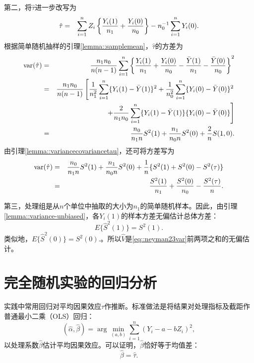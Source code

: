 第二，将$\hat{\tau}$进一步改写为
\begin{eqnarray*}
\hat{\tau} &=&  \sum_{i=1}^n Z_i  \left\{    \frac{  Y_i(1) }{ n_1 } + \frac{  Y_i(0) }{ n_0 }   \right\}
- n_0^{-1} \sum_{i=1}^n Y_i(0).
\end{eqnarray*}
根据简单随机抽样的引理\ref{lemma::samplemean}，$\hat{\tau}$的方差为
\begin{eqnarray*}
\textup{var}(\hat{\tau}) &=&  \frac{  n_1 n_0  }{  n(n-1)  }  \sum_{i=1}^n  
\left\{    \frac{  Y_i(1) }{ n_1 } + \frac{  Y_i(0) }{ n_0 }  -  \frac{  \bar{Y}(1) }{ n_1 } - \frac{  \bar{Y}(0) }{ n_0 }    \right\}^2 \\
&=&  \frac{  n_1 n_0  }{  n(n-1)  }  \left[
\frac{1}{n_1^{2}}   \sum_{i=1}^n  \{  Y_i(1) -  \bar{Y}(1)\}^2 + \frac{1}{n_0^{2}}  \sum_{i=1}^n  \{  Y_i(0) -  \bar{Y}(0)\}^2 \right. \\
&& \left. \qquad \qquad 
+ \frac{2}{n_1 n_0}  \sum_{i=1}^n  \{  Y_i(1) -  \bar{Y}(1)\}  \{  Y_i(0) -  \bar{Y}(0)\} 
\right]\\
&=& \frac{n_0}{n_1n} S^2(1) + \frac{n_1}{n_0n}S^2(0) + \frac{2}{n} S(1,0). 
\end{eqnarray*}
由引理\ref{lemma::variancecovariancetau}，还可将方差写为
\begin{eqnarray*}
\textup{var}(\hat{\tau})
&=& \frac{n_0}{n_1n} S^2(1) + \frac{n_1}{n_0n}S^2(0) + \frac{1}{n} \{ S^2(1)+S^2(0) - S^2(\tau) \}\\
&=&  \frac{S^2(1)}{n_1} + \frac{S^2(0)}{n_0} - \frac{S^2(\tau)}{n}.
\end{eqnarray*}

第三，处理组是从$n$个单位中抽取的大小为$n_1$的简单随机样本。因此，由引理\ref{lemma::variance-unbiased}，各$Y_i(1)$的样本方差无偏估计总体方差：
$$
E\{  \hat{S}^2(1) \} = S^2(1).
$$
类似地，$E\{  \hat{S}^2(0) \} = S^2(0).$。所以$\hat{V} $是\eqref{eq::neyman23var}前两项之和的无偏估计。 
 
 
 
 
 \section{完全随机实验的回归分析}
 
 
 
实践中常用回归对平均因果效应$\tau$作推断。标准做法是将结果对处理指标及截距作普通最小二乘（OLS）回归：
$$
(\hat\alpha, \hat\beta) = \arg\min_{(a,b)} \sum_{i=1}^n (Y_i - a - bZ_i)^2,
$$
以处理系数$ \hat\beta$估计平均因果效应。可以证明，$ \hat\beta$恰好等于均值差：
\begin{equation}
\label{eq::ols-difference-in-means}
\hat\beta = \hat\tau .
\end{equation}

